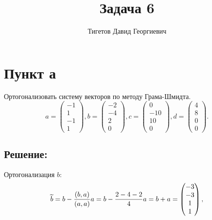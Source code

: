 \documentclass[12pt]{article}
\begin{document}
    \title{Задача 6}
    \author{Тигетов Давид Георгиевич}
    \date{}
    \maketitle

    \section*{Пункт а}
    Ортогонализовать систему векторов по методу Грама-Шмидта.
    \[
        a =
        \begin{pmatrix}
            -1 \\ 1 \\ -1 \\ 1
        \end{pmatrix},
        b =
        \begin{pmatrix}
            -2 \\ -4 \\ 2 \\ 0
        \end{pmatrix},
        c =
        \begin{pmatrix}
            0 \\ -10 \\ 10 \\ 0
        \end{pmatrix},
        d =
        \begin{pmatrix}
            4 \\ 8 \\ 0 \\ 0
        \end{pmatrix}.
    \]
    \subsection*{Решение:}
    Ортогонализация $b$:
    \[
        \widetilde{b}
        = b - \frac{\left ( b, a \right )}{\left ( a, a \right )} a
        = b - \frac{2-4-2}{4} a
        = b + a
        =
        \begin{pmatrix}
            -3 \\ -3 \\ 1 \\ 1
        \end{pmatrix} ,
    \]
\end{document}
